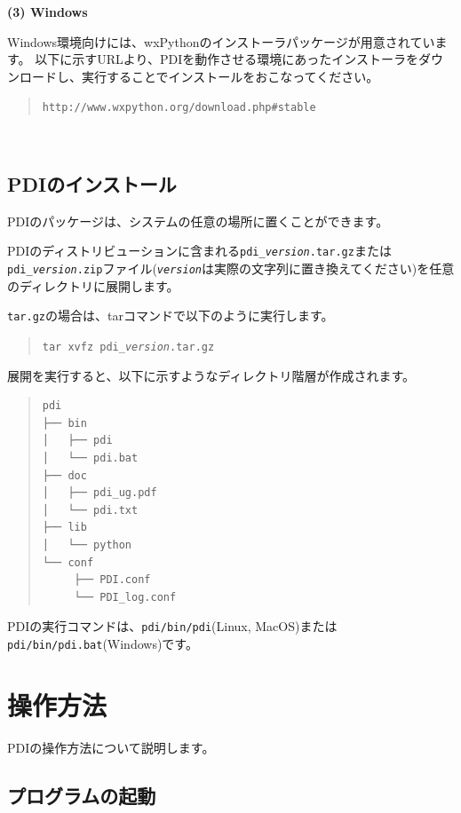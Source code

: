 \documentclass[a4paper,11pt]{jarticle}
\begin{document}
\textbf{(3) Windows}

Windows環境向けには、wxPythonのインストーラパッケージが用意されています。
以下に示すURLより、PDIを動作させる環境にあったインストーラをダウンロードし、実行することでインストールをおこなってください。
\begin{quote}
{\tt http://www.wxpython.org/download.php\#stable}
\end{quote}
{\ }\\



\subsection{PDIのインストール}

PDIのパッケージは、システムの任意の場所に置くことができます。

PDIのディストリビューションに含まれる{\tt pdi\_{\it version}.tar.gz}または{\tt pdi\_{\it version}.zip}ファイル({\tt\it version}は実際の文字列に置き換えてください)を任意のディレクトリに展開します。

{\tt tar.gz}の場合は、tarコマンドで以下のように実行します。

\begin{quote}
{\tt tar xvfz  pdi\_\textit{version}.tar.gz}
\end{quote}


展開を実行すると、以下に示すようなディレクトリ階層が作成されます。

\begin{quote}
\begin{verbatim}
pdi
├── bin
│   ├── pdi
│   └── pdi.bat
├── doc
│   ├── pdi_ug.pdf
│   └── pdi.txt
├── lib
│   └── python
└── conf
     ├── PDI.conf
     └── PDI_log.conf
\end{verbatim}
\end{quote}

PDIの実行コマンドは、{\tt pdi/bin/pdi}(Linux, MacOS)または{\tt pdi/bin/pdi.bat}(Windows)です。

\newpage
\section{操作方法}

PDIの操作方法について説明します。

\subsection{プログラムの起動}
\end{document}

